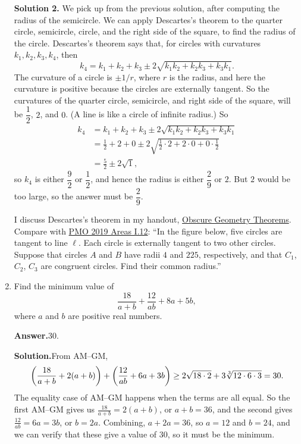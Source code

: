 \documentclass[11pt,paper=letter]{scrartcl}
\newcommand{\ans}{{\sffamily \bfseries Answer.}\;}
\newcommand{\sol}{{\sffamily \bfseries Solution.}\;}
\newcommand{\soln}[1]{{\sffamily \bfseries Solution #1.}\;}
\newenvironment{rem}%
{\noindent \ignorespaces \small \sffamily \sansmath {\bfseries Remark.}}%
{\ignorespacesafterend}
\begin{document}
\begin{enumerate}[left=0pt]
\soln2 We pick up from the previous solution, after computing the radius of the semicircle. We can apply Descartes's theorem to the quarter circle, semicircle, circle, and the right side of the square, to find the radius of the circle. Descartes's theorem says that, for circles with curvatures $k_1, k_2, k_3, k_4$, then \[
  k_4 = k_1 + k_2 + k_3 \pm 2\sqrt{k_1k_2 + k_2k_3 + k_3k_1}.
\]
The curvature of a circle is $\pm1/r$, where $r$ is the radius, and here the curvature is positive because the circles are externally tangent. So the curvatures of the quarter circle, semicircle, and right side of the square, will be $\dfrac{1}{2}$, $2$, and $0$. (A line is like a circle of infinite radius.) So
\begin{align*}
k_4 &= k_1 + k_2 + k_3 \pm 2\sqrt{k_1k_2 + k_2k_3 + k_3k_1} \\
&= \frac{1}{2} + 2 + 0 \pm 2\sqrt{\frac{1}{2} \cdot 2 + 2 \cdot 0 + 0 \cdot \frac{1}{2}} \\
&= \frac{5}{2} \pm 2\sqrt{1},
\end{align*}
so $k_4$ is either $\dfrac{9}{2}$ or $\dfrac{1}{2}$, and hence the radius is either $\dfrac{2}{9}$ or $2$. But $2$ would be too large, so the answer must be $\dfrac{2}{9}$.

\begin{rem}
I discuss Descartes's theorem in my handout, \href{https://cjquines.com/files/obscuregeothms.pdf}{Obscure Geometry Theorems}. Compare with \href{https://cjquines.com/files/pmo2019areas.pdf}{PMO 2019 Areas I.12}: ``In the figure below, five circles are tangent to line $\ell$. Each circle is externally tangent to two other circles. Suppose that circles $A$ and $B$ have radii $4$ and $225$, respectively, and that $C_1$, $C_2$, $C_3$ are congruent circles. Find their common radius.''
\end{rem}

\item Find the minimum value of \[
  \dfrac{18}{a + b} + \dfrac{12}{ab} + 8a + 5b,
\]
where $a$ and $b$ are positive real numbers.

\ans $\boxed{30}$.

\sol From AM--GM, \[
  \left(\frac{18}{a + b} + 2(a + b)\right) + \left(\frac{12}{ab} + 6a + 3b\right) \ge 2\sqrt{18 \cdot 2} + 3\sqrt[3]{12 \cdot 6 \cdot 3} = 30.
\]
The equality case of AM--GM happens when the terms are all equal. So the first AM--GM gives us $\frac{18}{a + b} = 2(a + b)$, or $a + b = 36$, and the second gives $\frac{12}{ab} = 6a = 3b$, or $b = 2a$. Combining, $a + 2a = 36$, so $a = 12$ and $b = 24$, and we can verify that these give a value of $30$, so it must be the minimum.


\end{enumerate}
\end{document}

